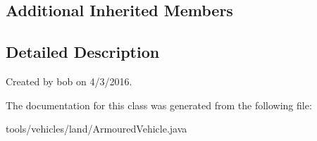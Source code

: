\subsection*{Additional Inherited Members}


\subsection{Detailed Description}
Created by bob on 4/3/2016. 

The documentation for this class was generated from the following file\+:\begin{DoxyCompactItemize}
\item 
tools/vehicles/land/Armoured\+Vehicle.\+java\end{DoxyCompactItemize}
